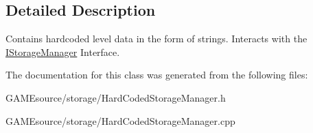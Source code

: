 \subsection{Detailed Description}
Contains hardcoded level data in the form of strings. Interacts with the \mbox{\hyperlink{class_i_storage_manager}{I\+Storage\+Manager}} Interface. 

The documentation for this class was generated from the following files\+:\begin{DoxyCompactItemize}
\item 
G\+A\+M\+Esource/storage/Hard\+Coded\+Storage\+Manager.\+h\item 
G\+A\+M\+Esource/storage/Hard\+Coded\+Storage\+Manager.\+cpp\end{DoxyCompactItemize}
